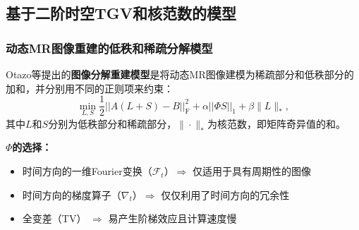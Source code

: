 \documentclass{beamer}
\begin{document}
\subsection{基于二阶时空TGV和核范数的模型}
%	
%
%

\begin{frame}
	\frametitle{动态MR图像重建的低秩和稀疏分解模型}
	Otazo等提出的\textbf{图像分解重建模型}是将动态MR图像建模为稀疏部分和低秩部分的加和，并分别用不同的正则项来约束：
    \begin{equation}
    	\min_{L,S}\frac{1}{2}||A(L+S)-B||_\mathrm{F}^2 + \alpha||\Phi S||_1 + \beta\|L\|_*,
    \end{equation}
     其中$L$和$S$分别为低秩部分和稀疏部分，$\|\cdot\|_*$为核范数，即矩阵奇异值的和。
     
     \textbf{$\Phi$的选择：}
     \begin{itemize}
     	\item 时间方向的一维Fourier变换（$\mathcal{F}_t$）$\Rightarrow$ 仅适用于具有周期性的图像
     	\item 时间方向的梯度算子（$\nabla_t$）$\Rightarrow$ 仅仅利用了时间方向的冗余性
     	\item 全变差（TV） $\Rightarrow$ 易产生阶梯效应且计算速度慢
     \end{itemize}
\end{frame}
\end{document}
